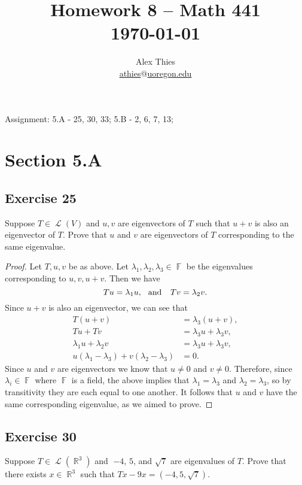 \documentclass[letterpaper, 12pt]{amsart}
\DeclareMathOperator{\R}{\mathbb{R}}				%
\DeclareMathOperator{\F}{\mathbb{F}}				%
\DeclareMathOperator{\Ell}{\mathscr{L}}				%
\theoremstyle{definition}  							%
\begin{document}
	\title{Homework 8  -- Math 441 \\ \today}
	\author{Alex Thies \\ \href{mailto:athies@uoregon.edu}{\lowercase{athies$@$uoregon.edu}}}

	\maketitle

	Assignment: 5.A - 25, 30, 33; 5.B - 2, 6, 7, 13;

	\section*{Section 5.A}
		\subsection*{Exercise 25}
		Suppose $T \in \Ell(V)$ and $u,v$ are eigenvectors of $T$ such that $u + v$ is also an eigenvector of $T$. 
		Prove that $u$ and $v$ are eigenvectors of $T$ corresponding to the same eigenvalue.

		\begin{proof}
		Let $T,u,v$ be as above.
		Let $\lambda_{1},\lambda_{2},\lambda_{3} \in \F$ be the eigenvalues corresponding to $u,v,u+v$.
		Then we have $$Tu = \lambda_{1}u, \hspace{2.5mm} \text{and } \hspace{2.5mm} Tv = \lambda_{2}v.$$
		Since $u+v$ is also an eigenvector, we can see that
			\begin{align*}
				T(u+v) &= \lambda_{3}(u + v), \\
				Tu + Tv &= \lambda_{3}u + \lambda_{3}v, \\
				\lambda_{1}u + \lambda_{2}v &= \lambda_{3}u + \lambda_{3}v, \\
				u(\lambda_{1} - \lambda_{3}) + v(\lambda_{2} - \lambda_{3}) &= 0.
			\end{align*}
		Since $u$ and $v$ are eigenvectors we know that $u \neq 0$ and $v \neq 0$. 
		Therefore, since $\lambda_{i} \in \F$ where $\F$ is a field, the above implies that $\lambda_{1} = \lambda_{3}$ and $\lambda_{2} = \lambda_{3}$, so by transitivity they are each equal to one another.
		It follows that $u$ and $v$ have the same corresponding eigenvalue, as we aimed to prove.
		\end{proof}
		\pagebreak

		\subsection*{Exercise 30}
		Suppose $T \in \Ell(\R^{3})$ and 􏰋$-4$, $5$, and $\sqrt{7}$ are eigenvalues of $T$.
		Prove that there exists $x \in \R^{3}$ such that $Tx - 9x = (-4, 5, \sqrt{7})$.
\end{document}
